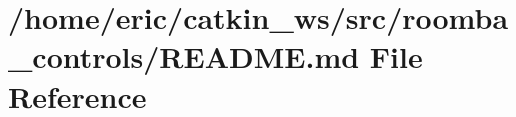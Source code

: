 \hypertarget{roomba__controls_2README_8md}{}\section{/home/eric/catkin\+\_\+ws/src/roomba\+\_\+controls/\+R\+E\+A\+D\+ME.md File Reference}
\label{roomba__controls_2README_8md}
